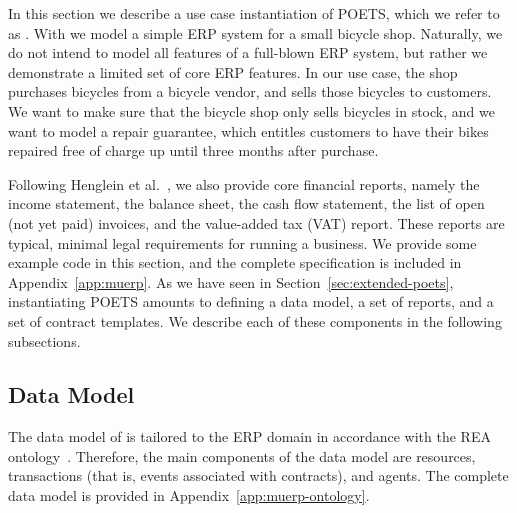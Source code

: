 In this section we describe a use case instantiation of POETS, which
we refer to as \muerp. With \muerp we model a simple ERP system for a
small bicycle shop. Naturally, we do not intend to model all features
of a full-blown ERP system, but rather we demonstrate a limited set of
core ERP features. In our use case, the shop purchases bicycles from
a bicycle vendor, and sells those bicycles to customers. We want to
make sure that the bicycle shop only sells bicycles in stock, and we
want to model a repair guarantee, which entitles customers to
have their bikes repaired free of charge up until three months after purchase.

Following Henglein et al.~\cite{henglein09jlap}, we also provide core
financial reports, namely the income statement, the balance sheet, the
cash flow statement, the list of open (not yet paid) invoices, and the
value-added tax (VAT) report. These reports are typical, minimal legal
requirements for running a business. We provide some example code in
this section, and the complete specification is included in
Appendix~\ref{app:muerp}. As we have seen in
Section~\ref{sec:extended-poets}, instantiating POETS amounts to
defining a data model, a set of reports, and a set of contract
templates. We describe each of these components in the following
subsections.

\subsection{Data Model}

The data model of \muerp is tailored to the ERP domain in accordance
with the REA ontology~\cite{mccarthy82tar}. Therefore, the main
components of the data model are resources, transactions (that is, events
associated with contracts), and agents. The complete data model is
provided in Appendix~\ref{app:muerp-ontology}.

~

